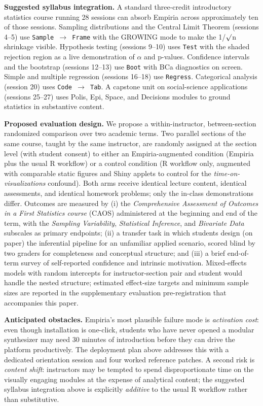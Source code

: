 \textbf{Suggested syllabus integration.} A standard three-credit
introductory statistics course running 28 sessions can absorb Empiria
across approximately ten of those sessions. Sampling distributions and
the Central Limit Theorem (sessions 4--5) use \texttt{Sample\ $\rightarrow$\ Frame}
with the GROWING mode to make the 1/\ensuremath{\surd}n shrinkage visible. Hypothesis
testing (sessions 9--10) uses \texttt{Test} with the shaded rejection
region as a live demonstration of \ensuremath{\alpha} and p-values. Confidence intervals
and the bootstrap (sessions 12--13) use \texttt{Boot} with BCa
diagnostics on screen. Simple and multiple regression (sessions 16--18)
use \texttt{Regress}. Categorical analysis (session 20) uses
\texttt{Code\ $\rightarrow$\ Tab}. A capstone unit on social-science applications
(sessions 25--27) uses Polis, Epi, Space, and Decisions modules to
ground statistics in substantive content.

\textbf{Proposed evaluation design.} We propose a within-instructor,
between-section randomized comparison over two academic terms. Two
parallel sections of the same course, taught by the same instructor, are
randomly assigned at the section level (with student consent) to either
an Empiria-augmented condition (Empiria plus the usual R workflow) or a
control condition (R workflow only, augmented with comparable static
figures and Shiny applets to control for the
\emph{time-on-visualizations} confound). Both arms receive identical
lecture content, identical assessments, and identical homework problems;
only the in-class demonstrations differ. Outcomes are measured by (i)
the \emph{Comprehensive Assessment of Outcomes in a First Statistics
course} (CAOS) administered at the beginning and end of the term, with
the \emph{Sampling Variability}, \emph{Statistical Inference}, and
\emph{Bivariate Data} subscales as primary endpoints; (ii) a transfer
task in which students design (on paper) the inferential pipeline for an
unfamiliar applied scenario, scored blind by two graders for
completeness and conceptual structure; and (iii) a brief end-of-term
survey of self-reported confidence and intrinsic motivation.
Mixed-effects models with random intercepts for instructor-section pair
and student would handle the nested structure; estimated effect-size
targets and minimum sample sizes are reported in the supplementary
evaluation pre-registration that accompanies this paper.

\textbf{Anticipated obstacles.} Empiria's most plausible failure mode is
\emph{activation cost}: even though installation is one-click, students
who have never opened a modular synthesizer may need 30 minutes of
introduction before they can drive the platform productively. The
deployment plan above addresses this with a dedicated orientation
session and four worked reference patches. A second risk is
\emph{content shift}: instructors may be tempted to spend
disproportionate time on the visually engaging modules at the expense of
analytical content; the suggested syllabus integration above is
explicitly \emph{additive} to the usual R workflow rather than
substitutive.

